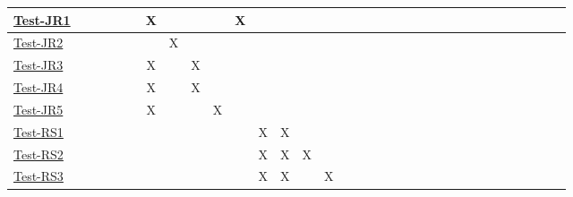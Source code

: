 \documentclass[12pt, titlepage]{article}
\begin{document}
\begin{landscape}
\begin{table}[H]
\begin{adjustwidth}{-0.1in}{-1in}
{\begin{tabular}{c|c|c|c|c|c|c|c|c|c|c|c|c|c|c|c|c|l|l|l|l|l|l|l|l|l|l|l|l|l|l|l|l|}
\multicolumn{1}{|l|}{\hyperref[itm:Test-JR1]{Test-JR1}}   &             &             &             &              &             &       X       &              &             &              &       X       &              &              &              &              &              &                & & & & &\\ \hline
\multicolumn{1}{|l|}{\hyperref[itm:Test-JR2]{Test-JR2}}   &             &              &             &             &             &              &        X      &             &              &              &             &             &              &              &              &                & & & & & \\ \hline
\multicolumn{1}{|l|}{\hyperref[itm:Test-JR3]{Test-JR3}}   &             &             &             &              &             &       X       &              &     X        &              &              &              &             &              &              &              &                & & & & & \\ \hline
\multicolumn{1}{|l|}{\hyperref[itm:Test-JR4]{Test-JR4}}   &             &             &             &              &             &       X       &              &     X        &              &              &             &             &              &              &              &                & & & & & \\ \hline
\multicolumn{1}{|l|}{\hyperref[itm:Test-JR5]{Test-JR5}}   &             &              &             &             &             &       X       &              &             &       X       &              &             &             &              &              &              &                & & & & & \\ \hline
\multicolumn{1}{|l|}{\hyperref[itm:Test-RS1]{Test-RS1}}   &             &             &             &              &             &              &              &             &              &              &        X      &       X       &              &              &              &                & & & & & \\ \hline
\multicolumn{1}{|l|}{\hyperref[itm:Test-RS2]{Test-RS2}}   &             &             &             &             &             &             &              &             &              &              &        X     &         X     &      X       &             &              &                & & & & & \\ \hline
\multicolumn{1}{|l|}{\hyperref[itm:Test-RS3]{Test-RS3}}   &             &             &             &              &             &              &             &             &              &              &        X      &       X       &              &     X         &              &                & & & & & \\ \hline

\end{tabular}}
\end{adjustwidth}
\end{table}
\end{landscape}
\end{document}
